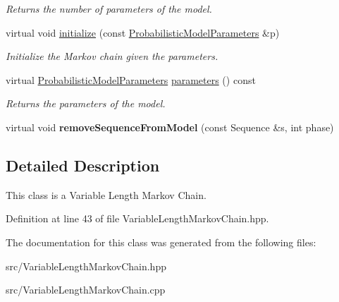 \begin{DoxyCompactItemize}
\begin{DoxyCompactList}\small\item\em Returns the number of parameters of the model. \end{DoxyCompactList}\item 
\mbox{\label{classtops_1_1VariableLengthMarkovChain_ab1534dcb0eafa33cd8a868ce59d0bcc0}} 
virtual void \hyperlink{classtops_1_1VariableLengthMarkovChain_ab1534dcb0eafa33cd8a868ce59d0bcc0}{initialize} (const \hyperlink{classtops_1_1ProbabilisticModelParameters}{Probabilistic\+Model\+Parameters} \&p)
\begin{DoxyCompactList}\small\item\em Initialize the Markov chain given the parameters. \end{DoxyCompactList}\item 
\mbox{\label{classtops_1_1VariableLengthMarkovChain_a30375c87ac16e8c2c66582b3b2a40f8d}} 
virtual \hyperlink{classtops_1_1ProbabilisticModelParameters}{Probabilistic\+Model\+Parameters} \hyperlink{classtops_1_1VariableLengthMarkovChain_a30375c87ac16e8c2c66582b3b2a40f8d}{parameters} () const
\begin{DoxyCompactList}\small\item\em Returns the parameters of the model. \end{DoxyCompactList}\item 
\mbox{\label{classtops_1_1VariableLengthMarkovChain_ac3295415524d62494c17b9e0e9e590c2}} 
virtual void {\bfseries remove\+Sequence\+From\+Model} (const Sequence \&s, int phase)
\end{DoxyCompactItemize}


\subsection{Detailed Description}
This class is a Variable Length Markov Chain. 

Definition at line 43 of file Variable\+Length\+Markov\+Chain.\+hpp.



The documentation for this class was generated from the following files\+:\begin{DoxyCompactItemize}
\item 
src/Variable\+Length\+Markov\+Chain.\+hpp\item 
src/Variable\+Length\+Markov\+Chain.\+cpp\end{DoxyCompactItemize}
